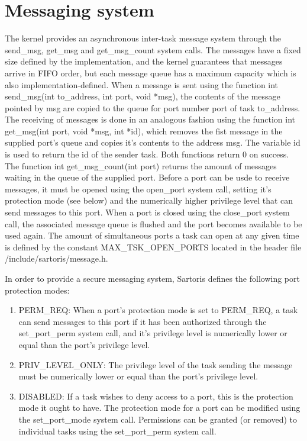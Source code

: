 \documentclass[11pt, letterpaper, twoside, english]{book}
\begin{document}
\section{Messaging system}
The kernel provides an asynchronous inter-task message system through the \textsf{send\_msg}, \textsf{get\_msg} and \textsf{get\_msg\_count} system calls. The messages have a fixed size defined by the implementation, and the kernel guarantees that messages arrive in FIFO order, but each message queue has a maximum capacity which is also implementation-defined. When a message is sent using the function \textsf{int send\_msg(int to\_address, int port, void *msg)}, the contents of the message pointed by \textsf{msg} are copied to the queue for port number \textsf{port} of task \textsf{to\_address}. The receiving of messages is done in an analogous fashion using the function \textsf{int get\_msg(int port, void *msg, int *id)}, which removes the fist message in the supplied \textsf{port}'s queue and copies it's contents to the address \textsf{msg}. The variable \textsf{id} is used to return the id of the sender task. Both functions return 0 on success. 
The function \textsf{int get\_msg\_count(int port)} returns the amount of messages waiting in the queue of the supplied port.
Before a port can be usde to receive messages, it must be opened using the \textsf{open\_port} system call, setting it's protection mode (see below) and the numerically higher privilege level that can send messages to this port. When a port is closed using the \textsf{close\_port} system call, the associated message queue is flushed and the port becomes available to be used again. The amount of simultaneous ports a task can open at any given time is defined by the constant \textsf{MAX\_TSK\_OPEN\_PORTS} located in the header file \textsf{/include/sartoris/message.h}. 

In order to provide a secure messaging system, Sartoris defines the following port protection modes:
\begin{enumerate}
\item[]\textsf{PERM\_REQ}: When a port's protection mode is set to \textsf{PERM\_REQ}, a task can send messages to this port if it has been authorized through the \textsf{set\_port\_perm} system call, and it's privilege level is numerically lower or equal than the port's privilege level.
\item[]\textsf{PRIV\_LEVEL\_ONLY}: The privilege level of the task sending the message must be numerically lower or equal than the port's privilege level.
\item[]\textsf{DISABLED}: If a task wishes to deny access to a port, this is the protection mode it ought to have.
The protection mode for a port can be modified using the \textsf{set\_port\_mode} system call. Permissions can be granted (or removed) to individual tasks using the \textsf{set\_port\_perm} system call.
\end{enumerate} 
\end{document}
